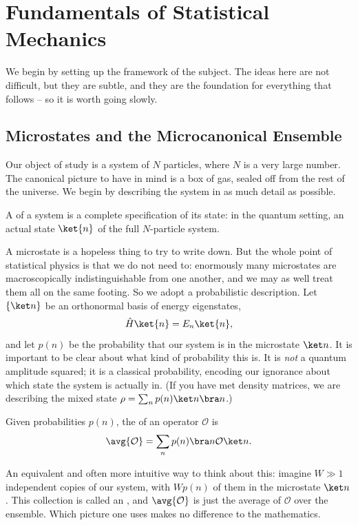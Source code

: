 \section{Fundamentals of Statistical Mechanics}

We begin by setting up the framework of the subject. The ideas here are not difficult, but they are subtle, and they are the foundation for everything that follows -- so it is worth going slowly.

\subsection{Microstates and the Microcanonical Ensemble}

Our object of study is a system of $N$ particles, where $N$ is a very large number. The canonical picture to have in mind is a box of gas, sealed off from the rest of the universe. We begin by describing the system in as much detail as possible.

\begin{definition}[Microstate]
	A  of a system is a complete specification of its state: in the quantum setting, an actual state $\ket{n}$ of the full $N$-particle system.
\end{definition}

A microstate is a hopeless thing to try to write down. But the whole point of statistical physics is that we do not need to: enormously many microstates are macroscopically indistinguishable from one another, and we may as well treat them all on the same footing. So we adopt a probabilistic description. Let $\{\ket n\}$ be an orthonormal basis of energy eigenstates,
$$
\hat H \ket{n} = E_n \ket{n},
$$
and let $p(n)$ be the probability that our system is in the microstate $\ket n$. It is important to be clear about what kind of probability this is. It is \emph{not} a quantum amplitude squared; it is a classical probability, encoding our ignorance about which state the system is actually in. (If you have met density matrices, we are describing the mixed state $\rho = \sum_n p(n) \ket n \bra n$.)

\begin{definition}
	Given probabilities $p(n)$, the  of an operator $\mathcal O$ is
	$$
	\avg{\mathcal O} = \sum_n p(n) \bra n \mathcal O \ket n.
	$$
\end{definition}

An equivalent and often more intuitive way to think about this: imagine $W \gg 1$ independent copies of our system, with $W p(n)$ of them in the microstate $\ket n$. This collection is called an , and $\avg{\mathcal O}$ is just the average of $\mathcal O$ over the ensemble. Which picture one uses makes no difference to the mathematics.

